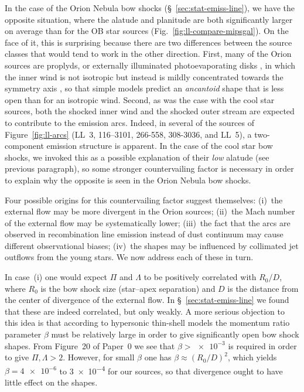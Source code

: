 
In the case of the Orion Nebula bow shocks
(\S~\ref{sec:stat-emiss-line}), we have the opposite situation, where
the alatude and planitude are both significantly larger on average
than for the OB star sources (Fig.~\ref{fig:ll-compare-mipsgal}).  On
the face of it, this is surprising because there are two differences
between the source classes that would tend to work in the other
direction.  First, many of the Orion sources are proplyds, or
externally illuminated photoevaporating disks \citep{ODell:2008b}, in
which the inner wind is not isotropic but instead is mildly
concentrated towards the symmetry axis \citep{Garcia-Arredondo:2001a},
so that simple models predict an \textit{ancantoid} shape
\citep[\S~5]{Tarango-Yong:2018a} that is less open than for an
isotropic wind.  Second, as was the case with the cool star sources,
both the shocked inner wind and the shocked outer stream are expected
to contribute to the emission arcs.  Indeed, in several of the sources
of Figure~\ref{fig:ll-arcs} (LL~3, 116--3101, 266-558, 308-3036, and
LL~5), a two-component emission structure is apparent.  In the case of
the cool star bow shocks, we invoked this as a possible explanation of
their \emph{low} alatude (see previous paragraph), so
some stronger countervailing factor is necessary in order to explain
why the opposite is seen in the Orion Nebula bow shocks.


Four possible origins for this countervailing factor suggest
themselves: (i)~the external flow may be more divergent in the Orion
sources; (ii)~the Mach number of the external flow may be
systematically lower; (iii)~the fact that the arcs are observed in
recombination line emission instead of dust continuum may cause
different observational biases; (iv)~the shapes may be influenced by
collimated jet outflows from the young stars.  We now address each of
these in turn.

In case~(i) one would expect \(\Pi\) and \(\Lambda\) to be positively
correlated with \(R_0/D\), where \(R_0\) is the bow shock size
(star--apex separation) and \(D\) is the distance from the center of
divergence of the external flow.  In \S~\ref{sec:stat-emiss-line} we
found that these are indeed correlated, but only weakly.  A more
serious objection to this idea is that according to hypersonic
thin-shell models \citep{Canto:1996} the momentum ratio parameter
\(\beta\) must be relatively large in order to give significantly open bow
shock shapes.  From Figure~20 of Paper~0 we see that
\(\beta > \num{e-3}\) is required in order to give
\(\Pi, \Lambda > 2\).  However, for small \(\beta\) one has
\(\beta \approx (R_0/D)^2\), which yields \(\beta = \num{4e-6}\) to \num{3e-4} for
our sources, so that divergence ought to have little effect on the
shapes.

